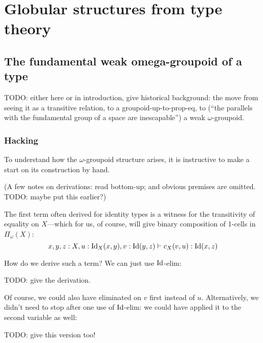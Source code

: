 
\chapter{Globular structures from type theory}



\section{The fundamental weak omega-groupoid of a type}


TODO: either here or in introduction, give historical background: the move from seeing it as a transitive relation, to a groupoid-up-to-prop-eq, to (``the parallels with the fundamental group of a space are inescapable'') a weak $\omega$-groupoid.

\subsection{Hacking} \label{sec:hacking} To understand how the $\omega$-groupoid structure arises, it is instructive to make a start on its construction by hand.

(A few notes on derivations: read bottom-up; and obvious premises are omitted.  TODO: maybe put this earlier?)

The first term often derived for identity types is a witness for the transitivity of equality on $X$---which for us, of course, will give binary composition of 1-cells in $\Pi_\omega(X)$:
$$ x,y,z:X, u:\mathrm{Id}_X(x,y), v:\mathrm{Id}(y,z) \vdash c_X(v,u) : \mathrm{Id}(x,z)$$

How do we derive such a term?  We can just use $\mathrm{Id}$-elim:

TODO: give the derivation.

Of course, we could also have eliminated on $v$ first instead of $u$.  Alternatively, we didn't need to stop after one use of $\mathrm{Id}$-elim: we could have applied it to the second variable as well:

TODO: give this version too!

